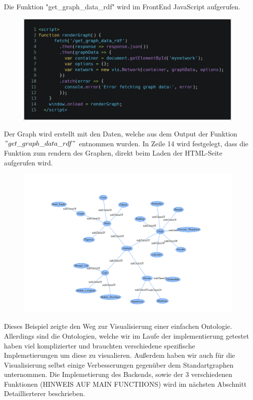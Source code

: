 Die Funktion "get\_graph\_data\_rdf" wird im FrontEnd JavaScript aufgerufen.
\begin{figure}[!ht]
    \includegraphics[scale=0.23]{Graphics/simple_ontology_js.png}
    \end{figure}

Der Graph wird erstellt mit den Daten, welche aus dem Output der Funktion $"get\_graph\_data\_rdf"$ entnommen wurden.
In Zeile 14 wird festgelegt, dass die Funktion zum rendern des Graphen, direkt beim Laden der HTML-Seite aufgerufen wird.

\begin{figure}[!ht]
    \includegraphics[scale=0.45]{Graphics/simple_graph.png}
    \end{figure}


 Dieses Beispiel zeigte den Weg zur Visualisierung einer einfachen Ontologie. 
 Allerdings sind die Ontologien, welche wir im Laufe der implementierung getestet haben viel komplizierter und brauchten verschiedene spezifische Implemetierungen um diese zu visualieren.
 Außerdem haben wir auch für die Visualisierung selbst einige Verbesserungen gegenüber dem Standartgraphen unternommen. 
 Die Implemetierung des Backends, sowie der 3 verschiedenen Funktionen (HINWEIS AUF MAIN FUNCTIIONS) wird im nächsten Abschnitt Detaillierterer beschrieben.
